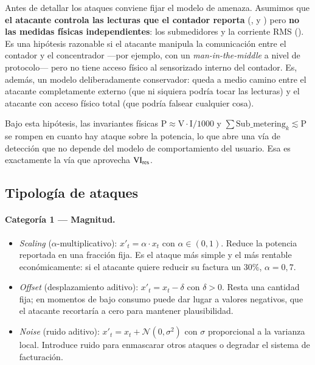 Antes de detallar los ataques conviene fijar el modelo de amenaza. Asumimos que \textbf{el atacante controla las lecturas que el contador reporta} (,  y ) pero \textbf{no las medidas físicas independientes}: los submedidores y la corriente RMS (). Es una hipótesis razonable si el atacante manipula la comunicación entre el contador y el concentrador ---por ejemplo, con un \textit{man-in-the-middle} a nivel de protocolo--- pero no tiene acceso físico al sensorizado interno del contador. Es, además, un modelo deliberadamente conservador: queda a medio camino entre el atacante completamente externo (que ni siquiera podría tocar las lecturas) y el atacante con acceso físico total (que podría falsear cualquier cosa).

Bajo esta hipótesis, las invariantes físicas $\mathrm{P} \approx \mathrm{V}\cdot\mathrm{I}/1000$ y $\sum \mathrm{Sub\_metering}_k \lesssim \mathrm{P}$ se rompen en cuanto hay ataque sobre la potencia, lo que abre una vía de detección que no depende del modelo de comportamiento del usuario. Esa es exactamente la vía que aprovecha $\mathrm{VI}_{\text{res}}$.

\subsection{Tipología de ataques}

\paragraph{Categoría 1 --- Magnitud.}

\begin{itemize}[leftmargin=*,topsep=0pt]
  \item \emph{Scaling} ($\alpha$-multiplicativo): $x'_t = \alpha \cdot x_t$ con $\alpha \in (0, 1)$. Reduce la potencia reportada en una fracción fija. Es el ataque más simple y el más rentable económicamente: si el atacante quiere reducir su factura un 30\%, $\alpha=0{,}7$.
  \item \emph{Offset} (desplazamiento aditivo): $x'_t = x_t - \delta$ con $\delta > 0$. Resta una cantidad fija; en momentos de bajo consumo puede dar lugar a valores negativos, que el atacante recortaría a cero para mantener plausibilidad.
  \item \emph{Noise} (ruido aditivo): $x'_t = x_t + \mathcal{N}(0, \sigma^2)$ con $\sigma$ proporcional a la varianza local. Introduce ruido para enmascarar otros ataques o degradar el sistema de facturación.
\end{itemize}

